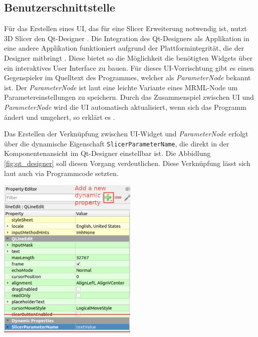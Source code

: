 \subsection{Benutzerschnittstelle}
\label{subsec:benutzerschnitstelle} Für das Erstellen eines \ac{UI}, das für
eine Slicer Erweiterung notwendig ist, nutzt 3D Slicer den Qt-Designer \citep[vgl.][]{qt2024}.
Die Integration des Qt-Designers als Applikation in eine andere Applikation funktioniert
aufgrund der Plattformintegrität, die der Designer mitbringt \citep[vgl.][]{qt2024}.
Diese bietet so die Möglichkeit die benötigten Widgets über ein interaktives
User Interface zu bauen. Für dieses \ac{UI}-Vorrischtung gibt es einen
Gegenspieler im Quelltext des Programmes, welcher als \textit{ParameterNode}
bekannt ist. Der \textit{ParameterNode} ist laut \citet{slicer2024} eine leichte
Variante eines \ac{MRML}-Node um Parametereinstellungen zu speichern. Durch das Zusammenspiel
zwischen \ac{UI} und \textit{ParameterNode} wird die \ac{UI} automatisch
aktualisiert, wenn sich das Programm ändert und umgehert, so erklärt es \citet{slicer2024}.

\begin{minipage}{0.35\textwidth}
	Das Erstellen der Verknüpfung zwischen UI-Widget und \textit{ParameterNode}
	erfolgt über die dynamische Eigenschaft \texttt{SlicerParameterName}, die
	direkt in der Komponentenansicht im Qt-Designer einstellbar ist. Die Abbidlung
	\ref{fig:qt_designer} soll diesen Vorgang verdeutlichen. Diese Verknüpfung
	lässt sich laut \citet{slicer2024} auch via Programmcode setzten.
\end{minipage}
\hfill
\begin{minipage}{0.55\textwidth}
	\centering
	\includegraphics[width=0.5\textwidth]{img/qt_designer.jpg}
	\label{fig:qt_designer}
\end{minipage}

